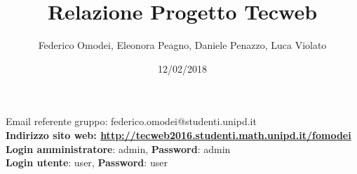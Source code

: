 
\title{\textbf{Relazione Progetto Tecweb}}
\author {Federico Omodei, Eleonora Peagno, Daniele Penazzo, Luca Violato}
\date{12/02/2018}


\begin{titlepage}
\thispagestyle{empty}
\vfill
\maketitle

\vfill

\begin{center}
Email referente gruppo: federico.omodei@studenti.unipd.it\\
\vfill
\textbf{Indirizzo sito web: \url{http://tecweb2016.studenti.math.unipd.it/fomodei}}\\
\textbf{Login amministratore}: admin, \textbf{Password}: admin \\
\textbf{Login utente}: user, \textbf{Password}: user
\vfill
\end{center}
\end{titlepage}

\pagebreak

\tableofcontents

\pagebreak



\pagebreak



\pagebreak



\pagebreak



\pagebreak





